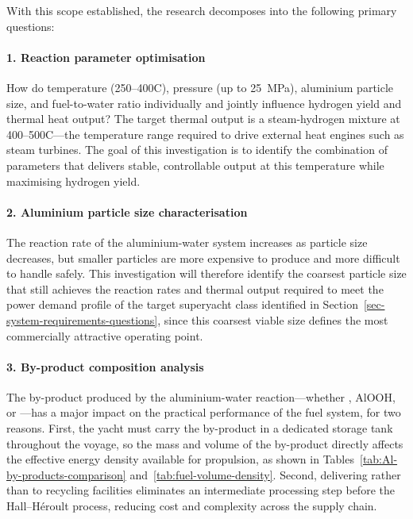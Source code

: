 \documentclass[12pt]{article}
\begin{document}
With this scope established, the research decomposes into the following primary 
questions:

\paragraph{1. Reaction parameter optimisation}

How do temperature (250--400\textdegree C), pressure (up to 25~MPa), aluminium 
particle size, and fuel-to-water ratio individually and jointly influence hydrogen 
yield and thermal heat output? The target thermal output is a steam-hydrogen mixture 
at 400--500\textdegree C---the temperature range required to drive external heat 
engines such as steam turbines. The goal of this investigation is to identify the 
combination of parameters that delivers stable, controllable output at this 
temperature while maximising hydrogen yield.

\paragraph{2. Aluminium particle size characterisation}

The reaction rate of the aluminium-water system increases as particle size decreases, 
but smaller particles are more expensive to produce and more difficult to handle 
safely. This investigation will therefore identify the coarsest particle size that 
still achieves the reaction rates and thermal output required to meet the power 
demand profile of the target superyacht class identified in Section~\ref{sec-system-requirements-questions}, 
since this coarsest viable size defines the most commercially attractive operating 
point.

\paragraph{3. By-product composition analysis}

The by-product produced by the aluminium-water reaction---whether , 
AlOOH, or ---has a major impact on the practical performance of the fuel 
system, for two reasons. First, the yacht must carry the by-product in a dedicated 
storage tank throughout the voyage, so the mass and volume of the by-product directly 
affects the effective energy density available for propulsion, as shown in 
Tables~\ref{tab:Al-by-products-comparison} and~\ref{tab:fuel-volume-density}. Second, delivering 
 rather than  to recycling facilities eliminates an 
intermediate processing step before the Hall--H\'{e}roult process, reducing cost 
and complexity across the supply chain.
\end{document}
